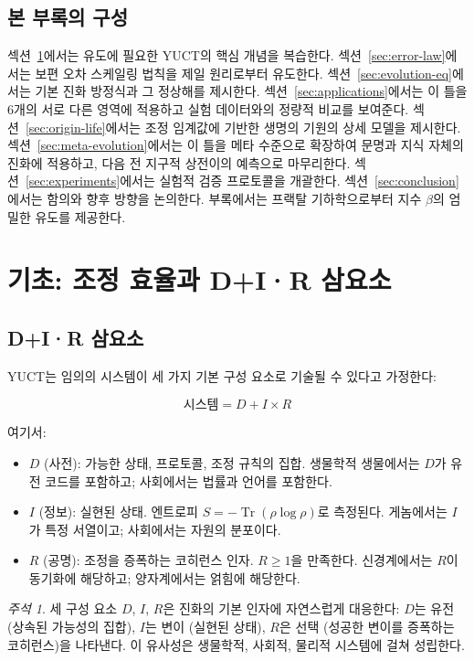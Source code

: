 \documentclass[12pt,a4paper]{article}
\DeclareMathOperator{\Tr}{Tr}
\theoremstyle{remark}
\newtheorem{remark}[theorem]{주석}
\begin{document}
	\subsection{본 부록의 구성}
	
	섹션~\ref{sec:foundations}에서는 유도에 필요한 YUCT의 핵심 개념을 복습한다. 섹션~\ref{sec:error-law}에서는 보편 오차 스케일링 법칙을 제일 원리로부터 유도한다. 섹션~\ref{sec:evolution-eq}에서는 기본 진화 방정식과 그 정상해를 제시한다. 섹션~\ref{sec:applications}에서는 이 틀을 6개의 서로 다른 영역에 적용하고 실험 데이터와의 정량적 비교를 보여준다. 섹션~\ref{sec:origin-life}에서는 조정 임계값에 기반한 생명의 기원의 상세 모델을 제시한다. 섹션~\ref{sec:meta-evolution}에서는 이 틀을 메타 수준으로 확장하여 문명과 지식 자체의 진화에 적용하고, 다음 전 지구적 상전이의 예측으로 마무리한다. 섹션~\ref{sec:experiments}에서는 실험적 검증 프로토콜을 개괄한다. 섹션~\ref{sec:conclusion}에서는 함의와 향후 방향을 논의한다. 부록에서는 프랙탈 기하학으로부터 지수 \(\beta\)의 엄밀한 유도를 제공한다.
	
	\section{기초: 조정 효율과 D+I·R 삼요소}
	\label{sec:foundations}
	
	\subsection{D+I·R 삼요소}
	
	YUCT는 임의의 시스템이 세 가지 기본 구성 요소로 기술될 수 있다고 가정한다:
	
	\begin{equation}
		\text{시스템} = D + I \times R
		\label{eq:triad}
	\end{equation}
	
	여기서:
	\begin{itemize}
		\item $D$ (사전): 가능한 상태, 프로토콜, 조정 규칙의 집합. 생물학적 생물에서는 $D$가 유전 코드를 포함하고; 사회에서는 법률과 언어를 포함한다.
		\item $I$ (정보): 실현된 상태. 엔트로피 $S = -\Tr(\rho \log \rho)$로 측정된다. 게놈에서는 $I$가 특정 서열이고; 사회에서는 자원의 분포이다.
		\item $R$ (공명): 조정을 증폭하는 코히런스 인자. $R \geq 1$을 만족한다. 신경계에서는 $R$이 동기화에 해당하고; 양자계에서는 얽힘에 해당한다.
	\end{itemize}
	
	\begin{remark}
		세 구성 요소 $D$, $I$, $R$은 진화의 기본 인자에 자연스럽게 대응한다: $D$는 유전 (상속된 가능성의 집합), $I$는 변이 (실현된 상태), $R$은 선택 (성공한 변이를 증폭하는 코히런스)을 나타낸다. 이 유사성은 생물학적, 사회적, 물리적 시스템에 걸쳐 성립한다.
	\end{remark}
	
\end{document}
